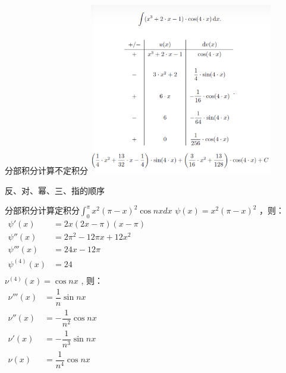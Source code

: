 \begin{frame}
	\frametitle{}
	\begin{alertblock}{分部积分计算不定积分}
		\centering
    \includegraphics[width=0.6\textwidth]{figs/2022-04-12-10-37-38.png}
	\end{alertblock}
	反、对、幂、三、指的顺序
\end{frame}

\begin{frame}{}
			\begin{alertblock}{分部积分计算定积分$\int_{0}^{\pi}   x^2 (\pi-x)^2   \cos nx dx $}
				$\psi (x) = x^2 (\pi-x)^2$ ，则：\\
				$\displaystyle \begin{array}{lllllllll}
					\psi ' (x) &=  2x(2x - \pi )(x - \pi ) \\
					\psi '' (x) &=  2\pi ^2 -12\pi x+12x^2 \\
					\psi ''' (x) &=  24x -12 \pi \\
					\psi^{(4)} (x) &=  24  \\
				\end{array}$ \\ 
				$\nu^{(4)} (x) = \cos nx$ , 则：\\
				$\displaystyle \begin{array}{lllllllll}
					\nu ''' (x) &= \dfrac{1}{n} \sin nx \\
					\nu '' (x) &= -\dfrac{1}{n^2} \cos nx \\
					\nu ' (x) &= -\dfrac{1}{n^3} \sin nx \\
					\nu (x) &= \dfrac{1}{n^4} \cos nx \\
				\end{array}$ \\ 
			\end{alertblock}
\end{frame}	
		
